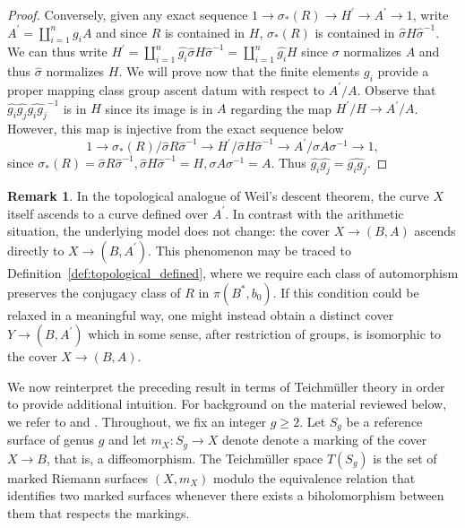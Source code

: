 \documentclass[10pt]{amsart}
\theoremstyle{definition}
\newtheorem{remark}[theorem]{Remark}
\begin{document}
\begin{proof}
Conversely, given any exact sequence $1\rightarrow \sigma_*(R) \rightarrow H^\prime \rightarrow A^\prime \rightarrow 1$, write $A^\prime = \coprod_{i=1}^ng_i A$ and since $R$ is contained in $H$, $\sigma_*(R)$ is contained in $\hat{\sigma}H\hat{\sigma}^{-1}$. We can thus write $H^\prime = \coprod_{i=1}^n \hat{g_i} \hat{\sigma} H \hat{\sigma}^{-1} =  \coprod_{i=1}^n \hat{g_i} H$ since $\sigma$ normalizes $A$ and thus $\hat{\sigma}$ normalizes $H$. We will prove now that the finite elements $g_i$ provide a proper mapping class group ascent datum with respect to $A^\prime/A$. Observe that $\hat{g_i}\hat{g_j}\widehat{g_ig_j}^{-1}$ is in $H$ since its image is in $A$ regarding the map $H^\prime/H \rightarrow A^\prime/A$. However, this map is injective from the exact sequence below
\[1\rightarrow \sigma_*(R)/\hat{\sigma}R\hat{\sigma}^{-1} \rightarrow H^\prime/\hat{\sigma}H\hat{\sigma}^{-1} \rightarrow A^\prime/ \sigma A \sigma^{-1}\rightarrow 1, \]
since $\sigma_*(R) = \hat{\sigma}R\hat{\sigma}^{-1}, \hat{\sigma}H\hat{\sigma}^{-1} = H, \sigma A \sigma^{-1} = A$. Thus $\hat{g_i}\hat{g_j}=\widehat{g_ig_j}$. 
\end{proof}

\begin{remark}
In the topological analogue of Weil’s descent theorem, the curve $X$ itself ascends to a curve defined over $A^\prime$. In contrast with the arithmetic situation, the underlying model does not change: the cover $X \to (B,A)$ ascends directly to $X \to (B,A^\prime)$. This phenomenon may be traced to Definition~\ref{def:topological_defined}, where we require each class of automorphism preserves the conjugacy class of $R$ in $\pi(B^*, b_0)$. If this condition could be relaxed in a meaningful way, one might instead obtain a distinct cover $Y \to (B, A^\prime)$ which in some sense, after restriction of groups, is isomorphic to the cover $X \to (B,A)$.
\end{remark}


We now reinterpret the preceding result in terms of Teichmüller theory in order to provide additional intuition. For background on the material reviewed below, we refer to \cite[Ch.~1]{MR2006093} and \cite[Pt.~2]{FarbMagalit}. Throughout, we fix an integer $g \geq 2$. Let $S_g$ be a reference surface of genus $g$ and let $m_X \colon S_g \rightarrow X$ denote denote a marking of the cover $X \to B$, that is, a diffeomorphism.
The Teichmüller space $T(S_g)$ is the set of marked Riemann surfaces $(X,m_X)$ modulo the equivalence relation that identifies two marked surfaces whenever there exists a biholomorphism between them that respects the markings.
\end{document}
